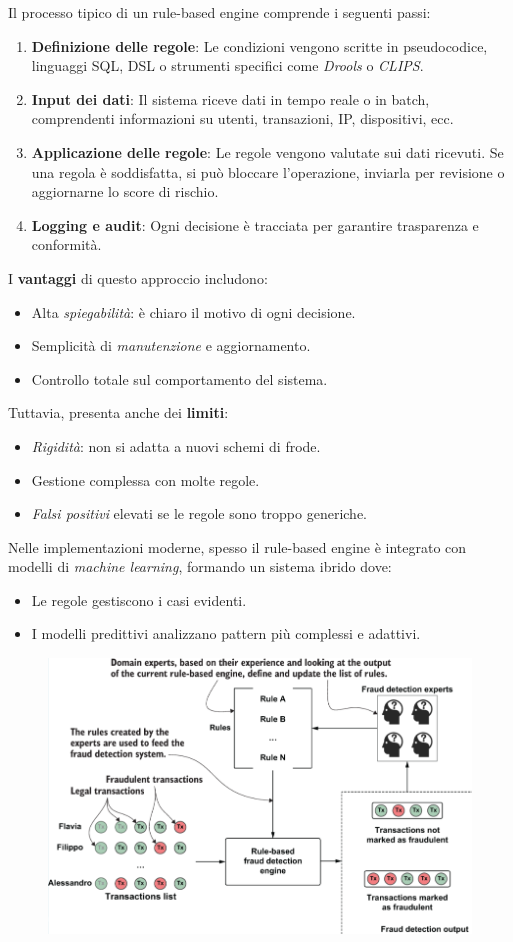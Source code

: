 Il processo tipico di un rule-based engine comprende i seguenti passi:

\begin{enumerate}
  \item \textbf{Definizione delle regole}: Le condizioni vengono scritte in pseudocodice, linguaggi SQL, DSL o strumenti specifici come \emph{Drools} o \emph{CLIPS}.
  \item \textbf{Input dei dati}: Il sistema riceve dati in tempo reale o in batch, comprendenti informazioni su utenti, transazioni, IP, dispositivi, ecc.
  \item \textbf{Applicazione delle regole}: Le regole vengono valutate sui dati ricevuti. Se una regola è soddisfatta, si può bloccare l'operazione, inviarla per revisione o aggiornarne lo score di rischio.
  \item \textbf{Logging e audit}: Ogni decisione è tracciata per garantire trasparenza e conformità.
\end{enumerate}

I \textbf{vantaggi} di questo approccio includono:
\begin{itemize}
  \item Alta \emph{spiegabilità}: è chiaro il motivo di ogni decisione.
  \item Semplicità di \emph{manutenzione} e aggiornamento.
  \item Controllo totale sul comportamento del sistema.
\end{itemize}

Tuttavia, presenta anche dei \textbf{limiti}:
\begin{itemize}
  \item \emph{Rigidità}: non si adatta a nuovi schemi di frode.
  \item Gestione complessa con molte regole.
  \item \emph{Falsi positivi} elevati se le regole sono troppo generiche.
\end{itemize}

Nelle implementazioni moderne, spesso il rule-based engine è integrato con modelli di \emph{machine learning}, formando un sistema ibrido dove:
\begin{itemize}
  \item Le regole gestiscono i casi evidenti.
  \item I modelli predittivi analizzano pattern più complessi e adattivi.
\end{itemize}

\begin{figure}[th]
    \centering
    \includegraphics[width=0.62\linewidth]{RecommendationsGraph//img/frauddetectionrule.png}
\end{figure}
\newpage

